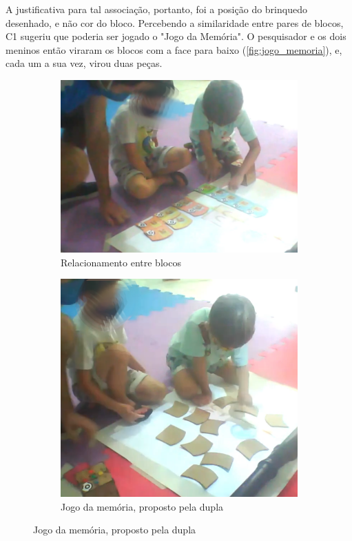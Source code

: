 A justificativa para tal associação, portanto, foi a posição do brinquedo desenhado, e não cor do bloco. Percebendo a similaridade entre pares de blocos, C1 sugeriu que poderia ser jogado o "Jogo da Memória". O pesquisador e os dois meninos então viraram os blocos com a face para baixo (\autoref{fig:jogo_memoria}), e, cada um a sua vez, virou duas peças.

\begin{figure}[!htbp]
    \begin{center}
    \begin{subfigure}{.5\textwidth}
        \centering
        \includegraphics[width=.9\linewidth,fbox]{figs/relacao_blocos.png}
        \caption{Relacionamento entre blocos}
        \label{fig:relacao_blocos}
    \end{subfigure}%
    \begin{subfigure}{.4\textwidth}
        \centering
        \includegraphics[width=.9\linewidth,fbox]{figs/jogo_memoria.png}
        \caption{Jogo da memória, proposto pela dupla}
        \label{fig:jogo_memoria}
    \end{subfigure}
    \end{center}
    \sourceauthor
    \label{fig:equipe1}
\end{figure}

